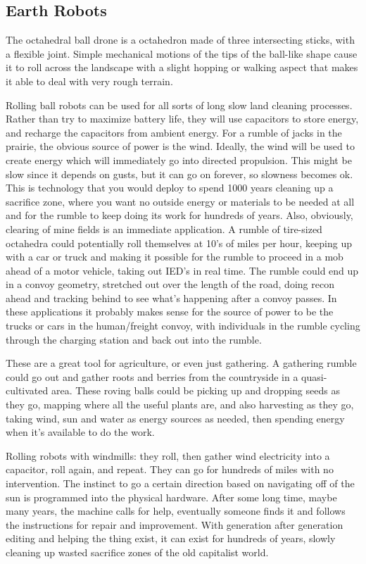 \documentclass[11pt]{article}
\begin{document}
\subsection{Earth Robots}\label{earth-robots}

The octahedral ball drone is a octahedron made of three intersecting
sticks, with a flexible joint. Simple mechanical motions of the tips of
the ball-like shape cause it to roll across the landscape with a slight
hopping or walking aspect that makes it able to deal with very rough
terrain.

Rolling ball robots can be used for all sorts of long slow land cleaning
processes. Rather than try to maximize battery life, they will use
capacitors to store energy, and recharge the capacitors from ambient
energy. For a rumble of jacks in the prairie, the obvious source of
power is the wind. Ideally, the wind will be used to create energy which
will immediately go into directed propulsion. This might be slow since
it depends on gusts, but it can go on forever, so slowness becomes ok.
This is technology that you would deploy to spend 1000 years cleaning up
a sacrifice zone, where you want no outside energy or materials to be
needed at all and for the rumble to keep doing its work for hundreds of
years. Also, obviously, clearing of mine fields is an immediate
application. A rumble of tire-sized octahedra could potentially roll
themselves at 10's of miles per hour, keeping up with a car or truck and
making it possible for the rumble to proceed in a mob ahead of a motor
vehicle, taking out IED's in real time. The rumble could end up in a
convoy geometry, stretched out over the length of the road, doing recon
ahead and tracking behind to see what's happening after a convoy passes.
In these applications it probably makes sense for the source of power to
be the trucks or cars in the human/freight convoy, with individuals in
the rumble cycling through the charging station and back out into the
rumble.

These are a great tool for agriculture, or even just gathering. A
gathering rumble could go out and gather roots and berries from the
countryside in a quasi-cultivated area. These roving balls could be
picking up and dropping seeds as they go, mapping where all the useful
plants are, and also harvesting as they go, taking wind, sun and water
as energy sources as needed, then spending energy when it's available to
do the work.

Rolling robots with windmills: they roll, then gather wind electricity
into a capacitor, roll again, and repeat. They can go for hundreds of
miles with no intervention. The instinct to go a certain direction based
on navigating off of the sun is programmed into the physical hardware.
After some long time, maybe many years, the machine calls for help,
eventually someone finds it and follows the instructions for repair and
improvement. With generation after generation editing and helping the
thing exist, it can exist for hundreds of years, slowly cleaning up
wasted sacrifice zones of the old capitalist world.
\end{document}
